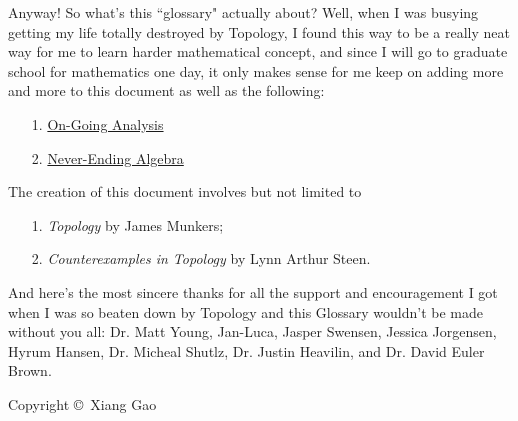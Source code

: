 Anyway! So what's this ``glossary" actually about? Well, when I was busying getting my life totally destroyed by Topology, I found this way to be a really neat way for me to learn harder mathematical concept, and since I will go to graduate school for mathematics one day, it only makes sense for me keep on adding more and more to this document as well as the following:
\begin{enumerate}
    \item[1.] \href{https://www.overleaf.com/project/616b3a6756e3c97b342c6a36}{On-Going Analysis}
    \item[2.] \href{https://www.overleaf.com/project/61843474f70cad11d2caf20f}{Never-Ending Algebra}
\end{enumerate}

The creation of this document involves but not limited to 
\begin{enumerate}
    \item[1.] \emph{Topology} by James Munkers;
    \item[2.] \emph{Counterexamples in Topology} by Lynn Arthur Steen.
\end{enumerate}

And here's the most sincere thanks for all the support and encouragement I got when I was so beaten down by Topology and this Glossary wouldn't be made without you all: Dr. Matt Young, Jan-Luca, Jasper Swensen, Jessica Jorgensen, Hyrum Hansen, Dr. Micheal Shutlz, Dr. Justin Heavilin, and Dr. David Euler Brown.

\vfill

\begin{minipage}[b]{0.9\textwidth}
\footnotesize\raggedright
\setlength{\parskip}{0.5\baselineskip}
Copyright \copyright \, \the\year{} Xiang Gao\par
\end{minipage}
\vspace*{2\baselineskip}

{\protect\hypertarget{toc}{}}
\tableofcontents

\newpage 
{}


\newpage 
{}


\newpage
{}


\newpage


\newpage

